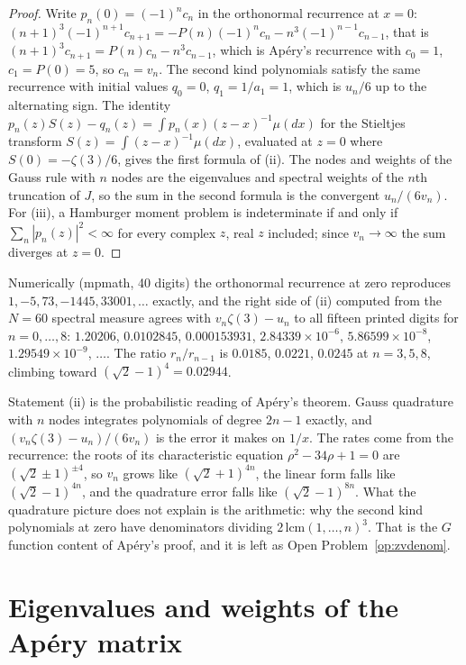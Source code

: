 \begin{proof}
Write $p_n(0)=(-1)^nc_n$ in the orthonormal recurrence at $x=0$: $(n+1)^3(-1)^{n+1}c_{n+1}=-P(n)(-1)^nc_n-n^3(-1)^{n-1}c_{n-1}$, that is $(n+1)^3c_{n+1}=P(n)c_n-n^3c_{n-1}$, which is Ap\'ery's recurrence with $c_0=1$, $c_1=P(0)=5$, so $c_n=v_n$. The second kind polynomials satisfy the same recurrence with initial values $q_0=0$, $q_1=1/a_1=1$, which is $u_n/6$ up to the alternating sign. The identity $p_n(z)S(z)-q_n(z)=\int p_n(x)(z-x)^{-1}\mu(dx)$ for the Stieltjes transform $S(z)=\int(z-x)^{-1}\mu(dx)$, evaluated at $z=0$ where $S(0)=-\zeta(3)/6$, gives the first formula of (ii). The nodes and weights of the Gauss rule with $n$ nodes are the eigenvalues and spectral weights of the $n$th truncation of $J$, so the sum in the second formula is the convergent $u_n/(6v_n)$. For (iii), a Hamburger moment problem is indeterminate if and only if $\sum_n|p_n(z)|^2<\infty$ for every complex $z$, real $z$ included; since $v_n\to\infty$ the sum diverges at $z=0$.
\end{proof}

Numerically (mpmath, 40 digits) the orthonormal recurrence at zero reproduces $1,-5,73,-1445,33001,\dots$ exactly, and the right side of (ii) computed from the $N=60$ spectral measure agrees with $v_n\zeta(3)-u_n$ to all fifteen printed digits for $n=0,\dots,8$: $1.20206$, $0.0102845$, $0.000153931$, $2.84339\times10^{-6}$, $5.86599\times10^{-8}$, $1.29549\times10^{-9}$, $\dots$. The ratio $r_n/r_{n-1}$ is $0.0185$, $0.0221$, $0.0245$ at $n=3,5,8$, climbing toward $(\sqrt2-1)^4=0.02944$.

Statement (ii) is the probabilistic reading of Ap\'ery's theorem. Gauss quadrature with $n$ nodes integrates polynomials of degree $2n-1$ exactly, and $(v_n\zeta(3)-u_n)/(6v_n)$ is the error it makes on $1/x$. The rates come from the recurrence: the roots of its characteristic equation $\rho^2-34\rho+1=0$ are $(\sqrt2\pm1)^{\pm4}$, so $v_n$ grows like $(\sqrt2+1)^{4n}$, the linear form falls like $(\sqrt2-1)^{4n}$, and the quadrature error falls like $(\sqrt2-1)^{8n}$. What the quadrature picture does not explain is the arithmetic: why the second kind polynomials at zero have denominators dividing $2\,\mathrm{lcm}(1,\dots,n)^3$. That is the $G$ function content of Ap\'ery's proof, and it is left as Open Problem~\ref{op:zvdenom}.

\section{Eigenvalues and weights of the Ap\'ery matrix}

